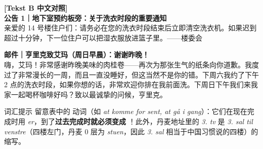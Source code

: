 \begin{transbox}
\small
\textbf{\color{NCDTeal}[Tekst B 中文对照]}\\
\textbf{公告 1｜地下室预约板旁：关于洗衣时段的重要通知}\\
亲爱的 14 号楼住户们：请务必在您的洗衣时段结束后立即清空洗衣机。如果迟到超过十分钟，下一位住户可以把湿衣服放进篮子里。——楼委会

\textbf{邮件｜亨里克致艾玛（周日早晨）：谢谢昨晚！}\\
嗨，艾玛！非常感谢昨晚美味的肉桂卷——再次为那张生气的纸条向你道歉。我度过了非常漫长的一周，而且一直没睡好，但这当然不是你的错。下周六我约了下午 2 点的洗衣时段，如果你想的话，非常欢迎你排在我前面洗。下周日下午我们来我家一起喝杯咖啡好吗？致以最诚挚的问候，亨里克。
\end{transbox}


\begin{tipbox}{词汇提示}
留意表中的 \dabold{[er]} 动词（如 \textit{at komme for sent, at gå i gang}）：它们在现在完成时用 \textit{er}，到了\textbf{过去完成时就必须变成 }！此外，丹麦地址里的 \textit{3. tv} 是 \textit{3. sal til venstre}（四楼左门，丹麦 0 层为 \textit{stuen}，因此 \textit{3. sal} 相当于中国习惯说的四楼）的缩写。
\end{tipbox}

